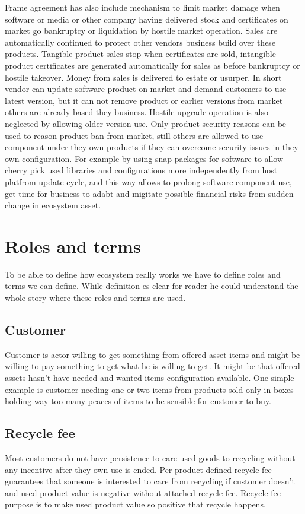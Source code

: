 Frame agreement has also include mechanism to limit market damage when software or media or other company having delivered stock and certificates on market go bankruptcy or liquidation by hostile market operation. Sales are automatically continued to protect other vendors business build over these products. Tangible product sales stop when certificates are sold, intangible product certificates are generated automatically for sales as before bankruptcy or hostile takeover. Money from sales is delivered to estate or usurper. In short vendor can update software product on market and demand customers to use latest version, but it can not remove product or earlier versions from market others are already based they business. Hostile upgrade operation is also neglected by allowing older version use. Only product security reasons can be used to reason product ban from market, still others are allowed to use component under they own products if they can overcome security issues in they own configuration. For example by using snap packages for software to allow cherry pick used libraries and configurations more independently from host platfrom update cycle, and this way allows to prolong software component use, get time for business to adabt and migitate possible financial risks from sudden change in ecosystem asset.

\section{Roles and terms}
\label{roles_and_terms}
To be able to define how ecosystem really works we have to define roles and terms we can define. While definition es clear for reader he could understand the whole story where these roles and terms are used.

\subsection{Customer}
\label{customer}
Customer is actor willing to get something from offered asset items and might be willing to pay something to get what he is willing to get. It might be that offered assets hasn't have needed and wanted items configuration available. One simple example is customer needing one or two items from products sold only in boxes holding way too many peaces of items to be sensible for customer to buy.

\subsection{Recycle fee}
\label{recycle_fee}
Most customers do not have persistence to care used goods to recycling without any incentive after they own use is ended. Per product defined recycle fee guarantees that someone is interested to care from recycling if customer doesn't and used product value is negative without attached recycle fee. Recycle fee purpose is to make used product value so positive that recycle happens.

